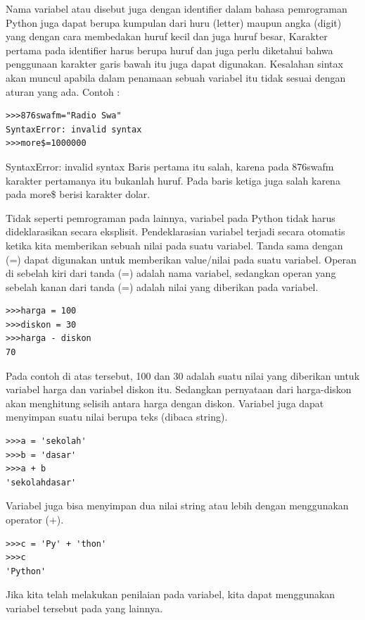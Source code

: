 Nama variabel atau disebut juga dengan identifier dalam bahasa pemrograman Python juga dapat berupa kumpulan dari huru (letter) maupun angka (digit) yang dengan cara membedakan huruf kecil dan juga huruf besar, Karakter pertama pada identifier harus berupa huruf dan juga perlu diketahui bahwa penggunaan karakter garis bawah itu juga dapat digunakan.
Kesalahan sintax akan muncul apabila dalam penamaan sebuah variabel itu tidak sesuai dengan aturan yang ada.
Contoh :
\begin{verbatim}
>>>876swafm="Radio Swa"
SyntaxError: invalid syntax
>>>more$=1000000
\end{verbatim}
SyntaxError: invalid syntax
Baris pertama itu salah, karena pada 876swafm karakter pertamanya itu bukanlah huruf. Pada baris ketiga juga salah karena pada more\$ berisi karakter dolar.

Tidak seperti pemrograman pada lainnya, variabel pada Python tidak harus dideklarasikan secara eksplisit. Pendeklarasian variabel terjadi secara otomatis ketika kita memberikan sebuah nilai pada suatu variabel. Tanda sama dengan (=) dapat digunakan untuk memberikan value/nilai pada suatu variabel. Operan di sebelah kiri dari tanda (=) adalah nama variabel, sedangkan operan yang sebelah kanan dari tanda (=) adalah nilai yang diberikan pada variabel.\cite{utamipemrograman}

\begin{verbatim}
>>>harga = 100
>>>diskon = 30
>>>harga - diskon
70
\end{verbatim}

Pada contoh di atas tersebut, 100 dan 30 adalah suatu nilai yang diberikan untuk variabel harga dan variabel diskon itu. Sedangkan pernyataan dari harga-diskon akan menghitung selisih antara harga dengan diskon. Variabel juga dapat menyimpan suatu nilai berupa teks (dibaca string).

\begin{verbatim}
>>>a = 'sekolah'
>>>b = 'dasar'
>>>a + b
'sekolahdasar'
\end{verbatim}

Variabel juga bisa menyimpan dua nilai string atau lebih dengan menggunakan operator (+).

\begin{verbatim}
>>>c = 'Py' + 'thon'
>>>c
'Python'
\end{verbatim}

Jika kita telah melakukan penilaian pada variabel, kita dapat menggunakan variabel tersebut pada yang lainnya.

